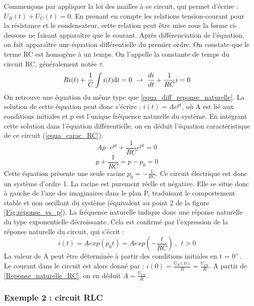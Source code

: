 	\vspace{1\baselineskip}
	Commençons par appliquer la loi des mailles à ce circuit, qui permet d'écrire : $U_{R}(t)+U_{C}(t)=0.$ En prenant en compte les relations tension-courant pour la résistance et le condensateur, cette relation peut être mise sous la forme ci-dessous ne faisant apparaître que le courant. Après différenciation de l'équation, on fait apparaître une équation différentielle du premier ordre. On constate que le terme RC est homogène à un temps. On l'appelle la constante de temps du circuit RC, généralement notée $\tau$.
	\begin{equation*}
	Ri(t)+\frac{1}{C}\int i(t) \mathrm{d} t=0~\rightarrow ~\frac{di}{dt}+\frac{1}{RC}i = 0
	\end{equation*}
	On retrouve une équation du même type que \ref{equa_diff_reponse_naturelle}. La solution de cette équation peut donc s'écrire : $i(t) = Ae^{pt}$, où A est lié aux conditions initiales et p est l'unique fréquence naturelle du système. En intégrant cette solution dans l'équation différentielle, on en déduit l'équation caractéristique de ce circuit (\ref{equa_carac_RC}).
	\begin{equation*}
	Ap\cdot e^{pt}+\frac{1}{RC} e^{pt}=0
	\end{equation*}
	\begin{equation}\label{equa_carac_RC}
	p+\frac{1}{RC}=p-p_{0}=0
	\end{equation}
	Cette équation présente une seule racine $p_{0} = -\frac{1}{RC}$. Ce circuit électrique est donc un système d'ordre 1. La racine est purement réelle et négative. Elle se situe donc à gauche de l'axe des imaginaires dans le plan P, traduisant le comportement stable et non oscillant du système (équivalent au point 2 de la figure \ref{Fig:reponse_vs_p}). La fréquence naturelle	indique donc une réponse naturelle du type exponentielle décroissante. Cela est confirmé par l'expression de la réponse naturelle du circuit, qui s'écrit :
	\begin{equation}\label{Reponse_naturelle_RC}
	i(t)=Aexp(p_{0}t)=Aexp(-\frac{t}{RC})~,~~t>0
	\end{equation}
	La valeur de A peut être déterminée à partir des conditions initiales en t = $0^{+}$. Le courant dans le circuit est alors donné par : $i(0)=\frac{U_{R}(0)}{R}=\frac{U_{C0}}{R}$. A partir de \ref{Reponse_naturelle_RC}, on en déduit $A=\frac{U_{C0}}{R}$.


	\subsubsection{Exemple 2 : circuit RLC}
	
